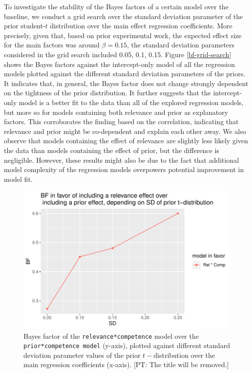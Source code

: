 \documentclass{sp}
\newcommand{\pt}[1]{\textcolor{Cerulean}{[PT: #1]}}
\begin{document}
To investigate the stability of the Bayes factors of a certain model over the baseline, we conduct a grid search over the standard deviation parameter of the prior student-$t$ distribution over the main effect regression coefficients. More precisely, given that, based on prior experimental work, the expected effect size for the main factors was around $\beta=0.15$, the standard deviation parameters considered in the grid search included {0.05, 0.1, 0.15}. Figure \ref{bf-grid-search} shows the Bayes factors against the intercept-only model of all the regression models plotted against the different standard deviation parameters of the priors. It indicates that, in general, the Bayes factor does not change strongly dependent on the tightness of the prior distribution. It further suggests that the intercept-only model is a better fit to the data than all of the explored regression models, but more so for models containing both relevance and prior as explanatory factors. This corroborates the finding based on the correlation, indicating that relevance and prior might be co-dependent and explain each other away. We also observe that models containing the effect of relevance are slightly less likely given the data than models containing the effect of prior, but the difference is negligible. However, these results might also be due to the fact that additional model complexity of the regression models overpowers potential improvement in model fit.

\begin{figure}[h]
	\begin{center}
		\includegraphics[width=\linewidth]{images/BF_vs_SD_rel-comp_pri-comp.pdf}
	\end{center}
	\vspace{-0.3cm}
	\caption{Bayes factor of the \texttt{relevance*competence} model over the \texttt{prior*competence model} (y-axis), plotted against different standard deviation parameter values of the prior $t-$distribution over the main regression coefficients (x-axis). \pt{The title will be removed.}}
	\label{bf-rel-pri}
\end{figure}
\end{document}

